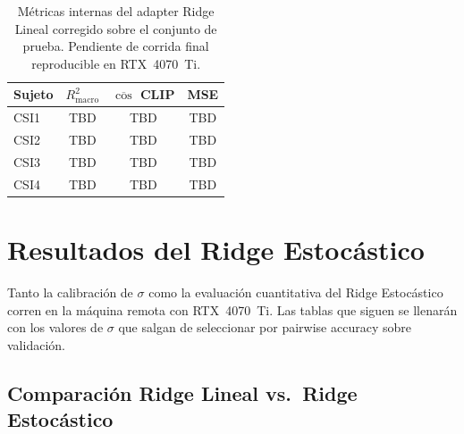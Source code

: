 \begin{table}[H]
\centering
\begin{tabular}{| l | c | c | c |}
\hline
\textbf{Sujeto} & \textbf{$R^{2}_{\mathrm{macro}}$} & \textbf{$\overline{\cos}$ CLIP} & \textbf{MSE} \\ \hline
CSI1 & TBD & TBD & TBD \\ \hline
CSI2 & TBD & TBD & TBD \\ \hline
CSI3 & TBD & TBD & TBD \\ \hline
CSI4 & TBD & TBD & TBD \\ \hline
\end{tabular}
\caption[Diagnóstico interno Ridge Lineal]{Métricas internas del adapter Ridge Lineal corregido 
sobre el conjunto de prueba. Pendiente de corrida final reproducible en RTX~4070~Ti.}
\label{table:ridge_internal_metrics}
\end{table}

\section{Resultados del Ridge Estocástico}

Tanto la calibración de $\sigma$ como la evaluación cuantitativa del Ridge Estocástico corren en 
la máquina remota con RTX~4070~Ti. Las tablas que siguen se llenarán con los valores de $\sigma$ 
que salgan de seleccionar por pairwise accuracy sobre validación.

\subsection{Comparación Ridge Lineal vs.\ Ridge Estocástico}

\begin{table}[H]
\centering
{}
\caption[Resultados por variante de adapter]{Métricas promedio sobre el conjunto de prueba 
BOLD5000 (sujeto CSI1). Pendiente de la corrida final del Ridge Estocástico en RTX~4070~Ti.}
\label{table:results_variants}
\end{table}


